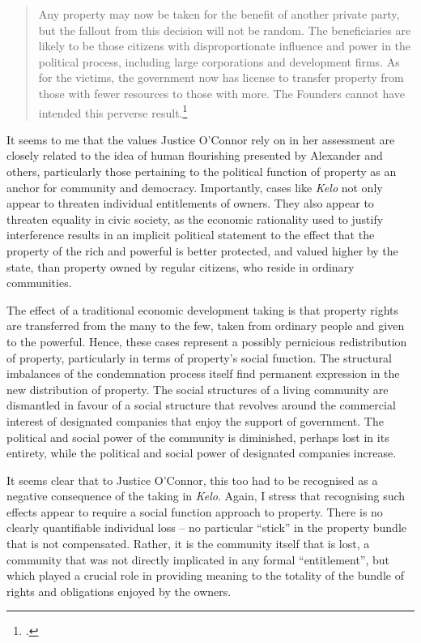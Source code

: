 \begin{quote}
Any property may now be taken for the benefit of another private party, but the fallout from this decision will not be random. The beneficiaries are likely to be those citizens with disproportionate influence and power in the political process, including large corporations and development firms. As for the victims, the government now has license to transfer property from those with fewer resources to those with more. The Founders cannot have intended this perverse result.\footcite[505]{kelo05}
\end{quote}

It seems to me that the values Justice O'Connor rely on in her assessment are closely related to the idea of human flourishing presented by Alexander and others, particularly those pertaining to the political function of property as an anchor for community and democracy. Importantly, cases like {\it Kelo} not only appear to threaten individual entitlements of owners. They also appear to threaten equality in civic society, as the economic rationality used to justify interference results in an implicit political statement to the effect that the property of the rich and powerful is better protected, and valued higher by the state, than property owned by regular citizens, who reside in ordinary communities.

The effect of a traditional economic development taking is that property rights are transferred from the many to the few, taken from ordinary people and given to the powerful. Hence, these cases represent a possibly pernicious redistribution of property, particularly in terms of property's social function. The structural imbalances of the condemnation process itself find permanent expression in the new distribution of property. The social structures of a living community are dismantled in favour of a social structure that revolves around the commercial interest of designated companies that enjoy the support of government. The political and social power of the community is diminished, perhaps lost in its entirety, while the political and social power of designated companies increase.

It seems clear that to Justice O'Connor, this too had to be recognised as a negative consequence of the taking in {\it Kelo}. Again, I stress that recognising such effects appear to require a social function approach to property. There is no clearly quantifiable individual loss -- no  particular ``stick'' in the property bundle that is not compensated. Rather, it is the community itself that is lost, a community that was not directly implicated in any formal ``entitlement'', but which played a crucial role in providing meaning to the totality of the bundle of rights and obligations enjoyed by the owners. 

